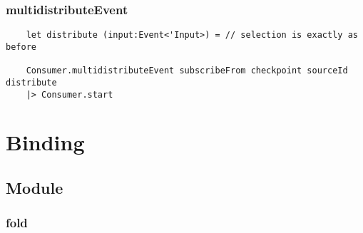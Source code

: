 \documentclass{article}
\begin{document}
\subsubsection{multidistributeEvent}

\begin{verbatim}
    let distribute (input:Event<'Input>) = // selection is exactly as before
    
    Consumer.multidistributeEvent subscribeFrom checkpoint sourceId distribute
    |> Consumer.start
\end{verbatim}







\clearpage
\section{Binding}
\subsection{Module}
\subsubsection{fold}
\end{document}
